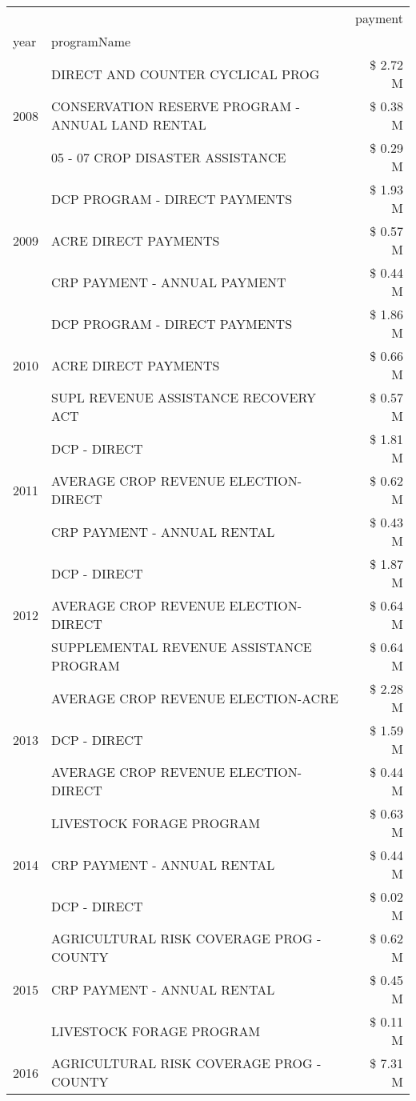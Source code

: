 \begin{tabular}{llr}
\toprule
 &  & payment \\
year & programName &  \\
\midrule
\multirow[t]{3}{*}{2008} & DIRECT AND COUNTER CYCLICAL PROG & \$ 2.72 M \\
 & CONSERVATION RESERVE PROGRAM - ANNUAL LAND RENTAL & \$ 0.38 M \\
 & 05 - 07 CROP DISASTER ASSISTANCE & \$ 0.29 M \\
\cline{1-3}
\multirow[t]{3}{*}{2009} & DCP PROGRAM - DIRECT PAYMENTS & \$ 1.93 M \\
 & ACRE DIRECT PAYMENTS & \$ 0.57 M \\
 & CRP PAYMENT - ANNUAL PAYMENT & \$ 0.44 M \\
\cline{1-3}
\multirow[t]{3}{*}{2010} & DCP PROGRAM - DIRECT PAYMENTS & \$ 1.86 M \\
 & ACRE DIRECT PAYMENTS & \$ 0.66 M \\
 & SUPL REVENUE ASSISTANCE RECOVERY ACT & \$ 0.57 M \\
\cline{1-3}
\multirow[t]{3}{*}{2011} & DCP - DIRECT & \$ 1.81 M \\
 & AVERAGE CROP REVENUE ELECTION-DIRECT & \$ 0.62 M \\
 & CRP PAYMENT - ANNUAL RENTAL & \$ 0.43 M \\
\cline{1-3}
\multirow[t]{3}{*}{2012} & DCP - DIRECT & \$ 1.87 M \\
 & AVERAGE CROP REVENUE ELECTION-DIRECT & \$ 0.64 M \\
 & SUPPLEMENTAL REVENUE ASSISTANCE PROGRAM & \$ 0.64 M \\
\cline{1-3}
\multirow[t]{3}{*}{2013} & AVERAGE CROP REVENUE ELECTION-ACRE & \$ 2.28 M \\
 & DCP - DIRECT & \$ 1.59 M \\
 & AVERAGE CROP REVENUE ELECTION-DIRECT & \$ 0.44 M \\
\cline{1-3}
\multirow[t]{3}{*}{2014} & LIVESTOCK FORAGE PROGRAM & \$ 0.63 M \\
 & CRP PAYMENT - ANNUAL RENTAL & \$ 0.44 M \\
 & DCP - DIRECT & \$ 0.02 M \\
\cline{1-3}
\multirow[t]{3}{*}{2015} & AGRICULTURAL RISK COVERAGE PROG - COUNTY & \$ 0.62 M \\
 & CRP PAYMENT - ANNUAL RENTAL & \$ 0.45 M \\
 & LIVESTOCK FORAGE PROGRAM & \$ 0.11 M \\
\cline{1-3}
\multirow[t]{3}{*}{2016} & AGRICULTURAL RISK COVERAGE PROG - COUNTY & \$ 7.31 M \\

\end{tabular}
